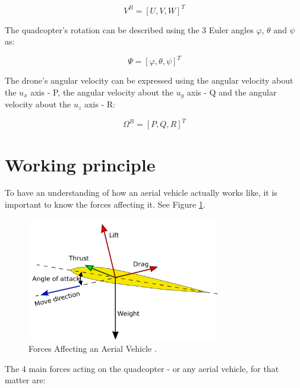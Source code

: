 \begin{equation}
	V^{B}=[U, V, W] ^{T}
\end{equation} 

The quadcopter's rotation can be described using the 3 Euler angles $\varphi$, $\theta$ and $\psi$ as:

\begin{equation}
	\Psi=[\varphi, \theta, \psi] ^{T}
\end{equation} 

The drone's angular velocity can be expressed using the angular velocity about the $u_{x}$ axis - P, the angular velocity about the $u_{y}$ axis - Q and the angular velocity about the $u_{z}$ axis - R:

\begin{equation}
	\Omega^{B}=[P, Q, R] ^{T}
\end{equation} 

\section{Working principle}

To have an understanding of how an aerial vehicle actually works like, it is important to know the forces affecting it. See Figure \ref{droneForces}.

\begin{figure}[H]
  \centering
    \includegraphics[width=0.75\textwidth]{images/forces.png}
	\caption{Forces Affecting an Aerial Vehicle \cite{ForcesFig}.}
	\label{droneForces}
\end{figure}

The 4 main forces acting on the quadcopter - or any aerial vehicle, for that matter are:

